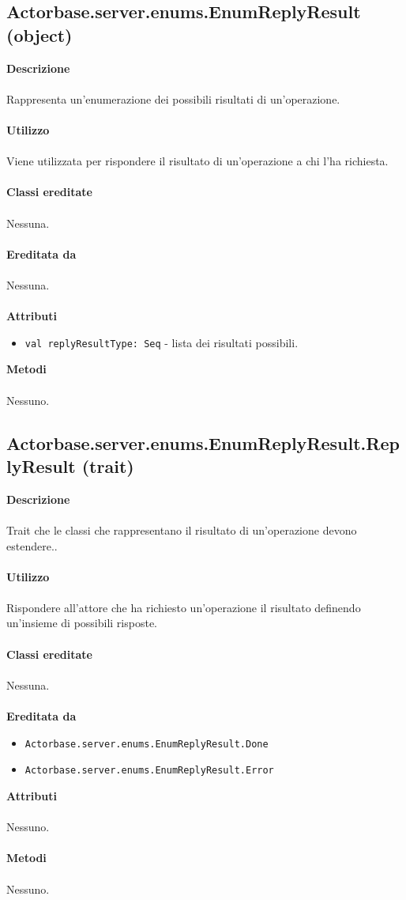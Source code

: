\documentclass[a4paper]{article}
\begin{document}
			\subsection{Actorbase.server.enums.EnumReplyResult (object)}
		\textbf{Descrizione}
			\\ \\
			Rappresenta un'enumerazione dei possibili risultati di un'operazione.
			\\ \\
		\textbf{Utilizzo}
			\\ \\
			Viene utilizzata per rispondere il risultato di un'operazione a chi l'ha richiesta.
			\\ \\
		\textbf{Classi ereditate}
		\\ \\
			Nessuna.
		\\ \\
		\textbf{Ereditata da}
		\\ \\
			Nessuna.
		\\ \\
		\textbf{Attributi}
			\begin{itemize}
				\item \texttt{val replyResultType: Seq} - lista dei risultati possibili.
			\end{itemize}
		\textbf{Metodi}
			\\ \\
			Nessuno.
		
				\subsection{Actorbase.server.enums.EnumReplyResult.ReplyResult (trait)}
		\textbf{Descrizione}
			\\ \\
			Trait che le classi che rappresentano il risultato di un'operazione devono estendere..
			\\ \\
		\textbf{Utilizzo}
			\\ \\
			Rispondere all'attore che ha richiesto un'operazione il risultato definendo un'insieme di possibili risposte.
			\\ \\
		\textbf{Classi ereditate}
		\\ \\
		Nessuna.
		\\ \\
		\textbf{Ereditata da}
			\begin{itemize}
				\item \texttt{Actorbase.server.enums.EnumReplyResult.Done}
				\item \texttt{Actorbase.server.enums.EnumReplyResult.Error}
			\end{itemize}
		\textbf{Attributi}
		\\ \\
			Nessuno.
		\\ \\
		\textbf{Metodi}
			\\ \\
			Nessuno.
		
\end{document}
